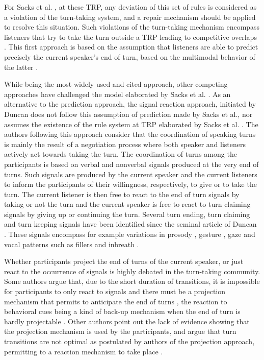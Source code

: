 For Sacks et al. \citep{sacks_simplest_1974}, at these TRP, any deviation of this set of rules is considered
as a violation of the turn-taking system, and a
repair mechanism should be applied to resolve this situation.
Such violations of the turn-taking mechanism
encompass listeners that try to take the turn outside a
TRP leading to competitive overlaps \citep{schegloff_overlapping_2000}.
This first approach is based on the assumption that
listeners are able to predict precisely the current speaker's end of turn, based on the multimodal behavior
of the latter \citep{de_ruiter_projecting_2006,french_turn-competitive_1983,ford_interactional_1996,mondada_multimodal_2007}. 

While being the most widely used and cited approach, other competing approaches have challenged the model elaborated by Sacks et al. \citep{sacks_simplest_1974}.
As an alternative to the prediction approach, the signal reaction approach, initiated by Duncan \citep{duncan_signals_1972} does
not follow this assumption of prediction made by Sacks et al., nor assumes
the existence of the rule system at TRP elaborated by Sacks et al. \citep{sacks_simplest_1974}. The authors following this approach consider
that the coordination of speaking turns is mainly
the result of a negotiation process where both speaker
and listeners actively act towards taking the turn. The
coordination of turns among the participants is based
on verbal and nonverbal signals produced at the very
end of turns. Such signals are produced by the current
speaker and the current listeners to inform the participants
of their willingness, respectively, to give or to take
the turn. The current listener is then free to react to the
end of turn signals by taking or not the turn and the
current speaker is free to react to turn claiming
signals by giving up or continuing the turn. Several turn ending, turn claiming and turn keeping signals have been identified since the seminal article of Duncan \citep{duncan_signals_1972}. These signals encompass for example variations in prosody \citep{duncan_signals_1972,gravano_turn-taking_2011,hjalmarsson_additive_2011}, gesture \citep{duncan_signals_1972,mondada_multimodal_2007}, gaze \citep{kendon_functions_1967,novick_coordinating_1996,oertel_gazeTT_2013} and vocal patterns such as fillers \citep{benus_pragmatic_2011} and inbreath \citep{torreira_planning_2015}. 

Whether participants project the end of turns of the
current speaker, or just react to the occurrence of signals
is highly debated in the turn-taking community.
Some authors argue that, due to the short duration
of transitions, it is impossible for participants to only
react to signals and there must be a projection mechanism
that permits to anticipate the end of turns \citep{magyari_prediction_2012,riest_anticipation_2015},
the reaction to behavioral cues being a kind of back-up
mechanism when the end of turn is hardly
projectable \citep{grosjean_using_1996}. Other authors point out the lack of evidence
showing that the projection mechanism is used
by the participants, and argue that turn transitions are
not optimal as postulated by authors of the projection
approach, permitting to a reaction mechanism to take
place \citep{heldner_pauses_2010}. 

